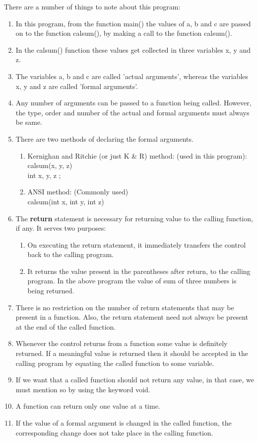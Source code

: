 There are a number of things to note about this program:
\begin{enumerate}
    \item In this program, from the function main() the values of a, b and c are passed on to the function calsum(), by making a call to the function calsum().
    \item In the calsum() function these values get collected in three variables x, y and z.
    \item The variables a, b and c are called 'actual arguments', whereas the variables x, y and z are called 'formal arguments'. \item Any number of arguments can be passed to a function being called. However, the type, order and number of the actual and formal arguments must always be same. 
    \item There are two methods of declaring the formal arguments. 
    \begin{enumerate}
        \item Kernighan and Ritchie (or just K \& R) method: (used in this program): \\ calsum(x, y, z)\\
        int x, y, z ;
        \item ANSI method: (Commonly used)\\
        calsum(int x, int y, int z)
    \end{enumerate}
    \item The \textbf{return} statement is necessary for returning value to the calling function, if any. It serves two purposes: \begin{enumerate}
        \item On executing the return statement, it immediately transfers the control back to the calling program.
        \item It returns the value present in the parentheses after return, to the calling program. In the above program the value of sum of three numbers is being returned.
    \end{enumerate}
    \item There is no restriction on the number of return statements that may be present in a function. Also, the return statement need not always be present at the end of the called function. 
    \item Whenever the control returns from a function some value is definitely returned. If a meaningful value is returned then it should be accepted in the calling program by equating the called function to some variable.
    \item If we want that a called function should not return any value, in that case, we must mention so by using the keyword void.
    \item A function can return only one value at a time.
    \item If the value of a formal argument is changed in the called function, the corresponding change does not take place in the calling function.
\end{enumerate}

